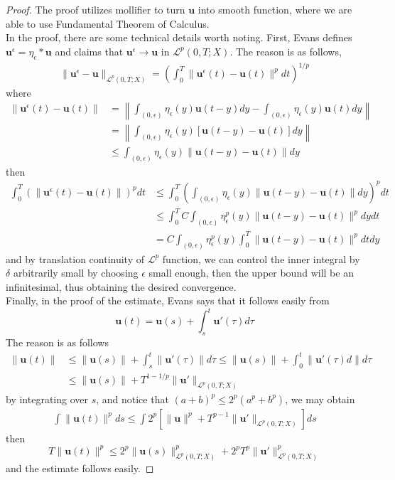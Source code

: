 \documentclass{article}
\begin{document}
\begin{proof} The proof utilizes mollifier to turn $\textbf{u}$ into smooth function, where we are able to use Fundamental Theorem of Calculus. \\
In the proof, there are some technical details worth noting. First, Evans defines $\textbf{u}^\epsilon=\eta_{\epsilon}*\textbf{u}$ and claims that $\textbf{u}^\epsilon\to\textbf{u}$ in $\mathscr{L}^p(0,T;X)$. The reason is as follows, 
\begin{align*}
    \|\textbf{u}^\epsilon-\textbf{u}\|_{\mathscr{L}^p(0, T; X)}=\left(\int_0^T\|\textbf{u}^\epsilon(t)-\textbf{u}(t)\|^pdt\right)^{1/p}
\end{align*}
where 
\begin{align*}
    \|\textbf{u}^\epsilon(t)-\textbf{u}(t)\|&=\left\|\int_{(0, \epsilon)}\eta_{\epsilon}(y)\textbf{u}(t-y)dy-\int_{(0, \epsilon)}\eta_{\epsilon}(y)\textbf{u}(t)dy\right\| \\
    &=\left\|\int_{(0, \epsilon)}\eta_{\epsilon}(y)\left[\textbf{u}(t-y)-\textbf{u}(t)\right]dy\right\| \\
    &\leq \int_{(0, \epsilon)}\eta_{\epsilon}(y)\left\|\textbf{u}(t-y)-\textbf{u}(t)\right\|dy
\end{align*}
then 
\begin{align*}
    \int_0^T\left(\|\textbf{u}^\epsilon(t)-\textbf{u}(t)\|\right)^pdt&\leq\int_0^T\left(\int_{(0, \epsilon)}\eta_\epsilon(y)\|\textbf{u}(t-y)-\textbf{u}(t)\|dy\right)^pdt \\
    &\leq \int_{0}^TC\int_{(0, \epsilon)}\eta^p_\epsilon(y)\|\textbf{u}(t-y)-\textbf{u}(t)\|^pdydt \\
    &=C\int_{(0, \epsilon)}\eta^p_\epsilon(y)\int_0^T\|\textbf{u}(t-y)-\textbf{u}(t)\|^pdtdy 
\end{align*}
and by translation continuity of $\mathscr{L}^p$ function, we can control the inner integral by $\delta$ arbitrarily small by choosing $\epsilon$ small enough, then the upper bound will be an infinitesimal, thus obtaining the desired convergence. \\
\indent Finally, in the proof of the estimate, Evans says that it follows easily from 
$$
\textbf{u}(t)=\textbf{u}(s)+\int_{s}^t\textbf{u}'(\tau)d\tau
$$
The reason is as follows
\begin{align*}
    \|\textbf{u}(t)\|&\leq \|\textbf{u}(s)\|+\int_s^t\|\textbf{u}'(\tau)\|d\tau \leq \|\textbf{u}(s)\|+\int_0^t\|\textbf{u}'(\tau)d\|d\tau \\
    &\leq \|\textbf{u}(s)\|+T^{1-1/p}\|\textbf{u}'\|_{\mathscr{L}^p(0,T;X)} 
\end{align*}
by integrating over $s$, and notice that $(a+b)^p\leq 2^p(a^p+b^p)$, we may obtain 
\begin{align*}
    \int\|\textbf{u}(t)\|^pds\leq \int 2^p\left[\|\textbf{u}\|^p+T^{p-1}\|\textbf{u}'\|_{\mathscr{L}^p(0,T;X)}\right]ds
\end{align*}
then 
$$
T\|\textbf{u}(t)\|^p\leq 2^p\|\textbf{u}(s)\|^p_{\mathscr{L}^p(0,T;X)}+2^pT^p\|\textbf{u}'\|_{\mathscr{L}^p(0,T;X)}^p
$$ and the estimate follows easily.
\end{proof}
\end{document}
